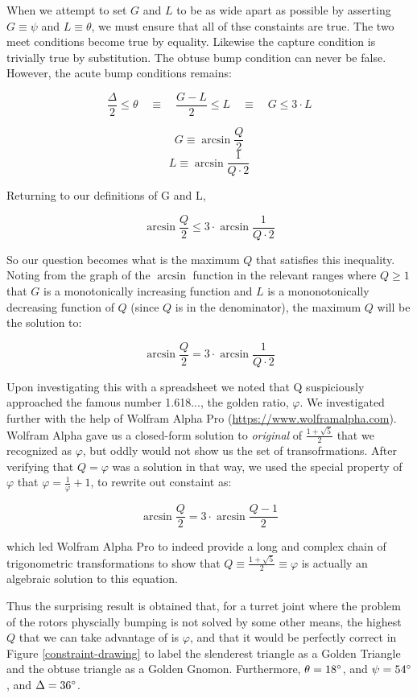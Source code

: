 \documentclass[11pt]{article}
\begin{document}
When we attempt to set $G$ and $L$ to be as wide apart as possible by asserting $G \equiv \psi$ and $L \equiv \theta$, we must
ensure that all of thse constaints are true. The two meet conditions become true by equality. Likewise the capture condition
is trivially true by substitution. The obtuse bump condition can
never be false.  However, the acute bump conditions remains:

\[ \tag{acute bump} \frac{\Delta}{2} \leq \theta  \quad \equiv \quad \frac{G - L}{2} \leq L  \quad \equiv \quad G \leq 3 \cdot L \]

\[
G \equiv \arcsin{\frac{Q}{2}}
\]
\[
L \equiv \arcsin{\frac{1}{Q \cdot 2}}
\]

Returning to our definitions of G and L,

\[ \arcsin{\frac{Q}{2}} \leq 3 \cdot \arcsin{\frac{1}{Q \cdot 2}} \]

So our question becomes what is the maximum $Q$ that satisfies this inequality. Noting from the graph of the $\arcsin$ function in
the relevant ranges where $Q \geq 1$ that $G$ is a monotonically increasing function and $L$ is a
mononotonically decreasing function of $Q$ (since $Q$ is in the denominator), the maximum $Q$ will be the solution to:

\[\tag{original}  \arcsin{\frac{Q}{2}} = 3 \cdot \arcsin{\frac{1}{Q \cdot 2}} \]

Upon investigating this with a spreadsheet we noted that Q suspiciously approached the famous number 1.618..., the golden ratio, $\varphi$.
We investigated further with the help of Wolfram Alpha Pro
(\href{https://www.wolframalpha.com}{https://www.wolframalpha.com}).
Wolfram Alpha gave us a closed-form solution to \emph{original} of $\frac{1 + \sqrt{5}}{2}$
that we recognized as $\varphi$, but oddly would
not show us the set of transofrmations. After verifying that $Q = \varphi$ was
a solution in that way, we used the special property of
$\varphi$ that $ \varphi = \frac{1}{\varphi} + 1 $, to rewrite out constaint as:

\[\tag{assuming $Q=\varphi$} \arcsin{\frac{Q}{2}} = 3 \cdot \arcsin{\frac{Q - 1}{2}} \]

which led Wolfram Alpha Pro to indeed provide a long and complex chain of trigonometric transformations to show that
$Q \equiv \frac{1 + \sqrt{5}}{2} \equiv \varphi$ is actually an algebraic solution to
this equation.

Thus the surprising result is obtained that, for a turret joint where the problem of the rotors physcially bumping is not
solved by some other means, the highest $Q$ that we can take advantage of is $\varphi$, and that it would be
perfectly correct in Figure \ref{constraint-drawing} to label the slenderest triangle as a Golden Triangle and the obtuse
triangle as a Golden Gnomon. Furthermore, $\theta = 18\degree$, and $\psi = 54\degree$, and $\Delta = 36\degree$.
\end{document}
